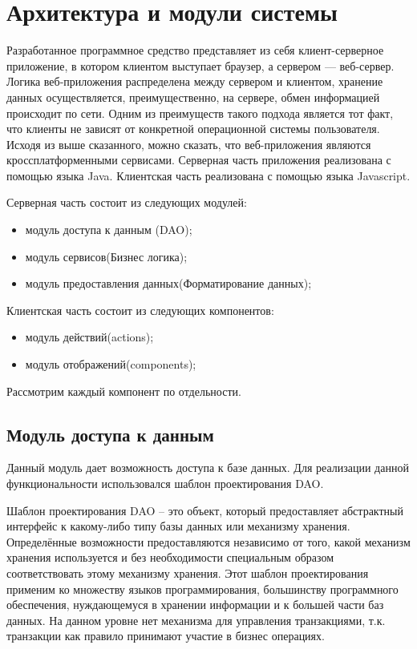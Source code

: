 
\section{Архитектура и модули системы} %
\label{sec:arch_and_mod}

Разработанное программное средство представляет из себя клиент-серверное приложение, в котором клиентом выступает браузер, а сервером — веб-сервер. Логика веб-приложения распределена между сервером и клиентом, хранение данных осуществляется, преимущественно, на сервере, обмен информацией происходит по сети. Одним из преимуществ такого подхода является тот факт, что клиенты не зависят от конкретной операционной системы пользователя. Исходя из выше сказанного, можно сказать, что веб-приложения являются кроссплатформенными сервисами. Серверная часть приложения реализована с помощью языка Java. Клиентская часть реализована с помощью языка Javascript.

Серверная часть состоит из следующих модулей:
\begin{itemize}
	\item модуль доступа к данным (DAO);
	\item модуль сервисов(Бизнес логика);
	\item модуль предоставления данных(Форматирование данных);
\end{itemize}

Клиентская часть состоит из следующих компонентов:
\begin{itemize}
	\item модуль действий(actions);
	\item модуль отображений(components);
\end{itemize}

Рассмотрим каждый компонент по отдельности. 

\subsection{Модуль доступа к данным}
\label{sub:arch_and_mod:lexer}

Данный модуль дает возможность доступа к базе данных. Для реализации данной функциональности использовался шаблон проектирования DAO. 

Шаблон проектирования DAO -- это объект, который предоставляет абстрактный интерфейс к какому-либо типу базы данных или механизму хранения. Определённые возможности предоставляются независимо от того, какой механизм хранения используется и без необходимости специальным образом соответствовать этому механизму хранения. Этот шаблон проектирования применим ко множеству языков программирования, большинству программного обеспечения, нуждающемуся в хранении информации и к большей части баз данных. На данном  уровне нет механизма для управления транзакциями, т.к. транзакции как правило принимают участие в бизнес операциях.  

